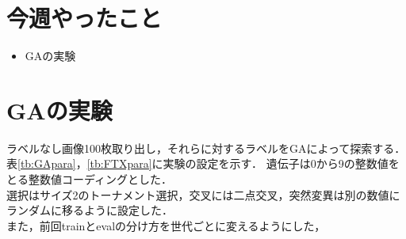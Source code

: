 \documentclass[twocolumn]{jarticle}     %
\begin{document}


\section{今週やったこと}

\begin{itemize}
	\item GAの実験
\end{itemize}

\section{GAの実験}

ラベルなし画像100枚取り出し，それらに対するラベルをGAによって探索する．
表\ref{tb:GApara}，\ref{tb:FTXpara}に実験の設定を示す．
遺伝子は0から9の整数値をとる整数値コーディングとした．\\
選択はサイズ2のトーナメント選択，交叉には二点交叉，突然変異は別の数値にランダムに移るように設定した．\\
また，前回trainとevalの分け方を世代ごとに変えるようにした，

\begin{table}[h]
	\centering
	\caption{GAの設定\label{tb:GApara}}
\end{table}
\end{document}
